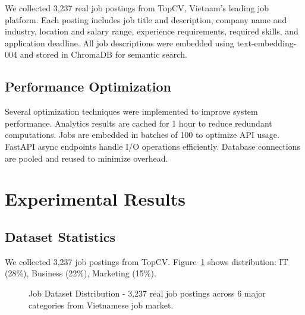 \documentclass[conference]{IEEEtran}
\begin{document}
We collected 3,237 real job postings from TopCV, Vietnam's leading job platform. Each posting includes job title and description, company name and industry, location and salary range, experience requirements, required skills, and application deadline. All job descriptions were embedded using text-embedding-004 and stored in ChromaDB for semantic search.

\subsection{Performance Optimization}

Several optimization techniques were implemented to improve system performance. Analytics results are cached for 1 hour to reduce redundant computations. Jobs are embedded in batches of 100 to optimize API usage. FastAPI async endpoints handle I/O operations efficiently. Database connections are pooled and reused to minimize overhead.

\section{Experimental Results}

\subsection{Dataset Statistics}

We collected 3,237 job postings from TopCV. Figure~\ref{fig:dataset_dist} shows distribution: IT (28\%), Business (22\%), Marketing (15\%).

\begin{figure}[htbp]
\centering
{}
\caption{Job Dataset Distribution - 3,237 real job postings across 6 major categories from Vietnamese job market.}
\label{fig:dataset_dist}
\end{figure}
\end{document}
